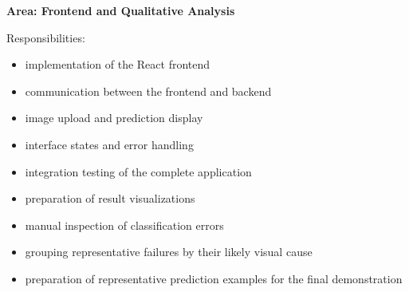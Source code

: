 \documentclass[11pt,a4paper]{article}
\begin{document}
\textbf{Area: Frontend and Qualitative Analysis}

Responsibilities:

\begin{itemize}
    \item implementation of the React frontend
    \item communication between the frontend and backend
    \item image upload and prediction display
    \item interface states and error handling
    \item integration testing of the complete application
    \item preparation of result visualizations
    \item manual inspection of classification errors
    \item grouping representative failures by their likely visual cause
    \item preparation of representative prediction examples for the final demonstration
\end{itemize}
\end{document}
